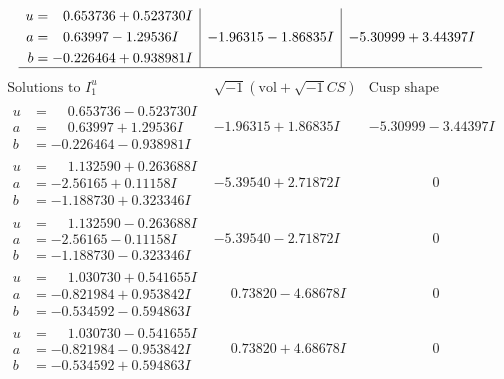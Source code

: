 \documentclass[1p]{elsarticle_modified}
\theoremstyle{definition}
\newcommand{\I}{\sqrt{-1}}
\begin{document}
$$\begin{array}{c|c|c}
\begin{aligned}
u &= \phantom{-}0.653736 + 0.523730 I \\
a &= \phantom{-}0.63997 - 1.29536 I \\
b &= -0.226464 + 0.938981 I\end{aligned}
 & -1.96315 - 1.86835 I & -5.30999 + 3.44397 I\\
 \hline 
 \end{array}$$\newpage$$\begin{array}{c|c|c}  
\text{Solutions to }I^u_{1}& \I (\text{vol} + \sqrt{-1}CS) & \text{Cusp shape}\\
 \hline 
\begin{aligned}
u &= \phantom{-}0.653736 - 0.523730 I \\
a &= \phantom{-}0.63997 + 1.29536 I \\
b &= -0.226464 - 0.938981 I\end{aligned}
 & -1.96315 + 1.86835 I & -5.30999 - 3.44397 I \\ \hline\begin{aligned}
u &= \phantom{-}1.132590 + 0.263688 I \\
a &= -2.56165 + 0.11158 I \\
b &= -1.188730 + 0.323346 I\end{aligned}
 & -5.39540 + 2.71872 I & \phantom{-0.000000 } 0 \\ \hline\begin{aligned}
u &= \phantom{-}1.132590 - 0.263688 I \\
a &= -2.56165 - 0.11158 I \\
b &= -1.188730 - 0.323346 I\end{aligned}
 & -5.39540 - 2.71872 I & \phantom{-0.000000 } 0 \\ \hline\begin{aligned}
u &= \phantom{-}1.030730 + 0.541655 I \\
a &= -0.821984 + 0.953842 I \\
b &= -0.534592 - 0.594863 I\end{aligned}
 & \phantom{-}0.73820 - 4.68678 I & \phantom{-0.000000 } 0 \\ \hline\begin{aligned}
u &= \phantom{-}1.030730 - 0.541655 I \\
a &= -0.821984 - 0.953842 I \\
b &= -0.534592 + 0.594863 I\end{aligned}
 & \phantom{-}0.73820 + 4.68678 I & \phantom{-0.000000 } 0 \\ \hline\begin{aligned}

\end{aligned}
\end{array}$$
\end{document}
